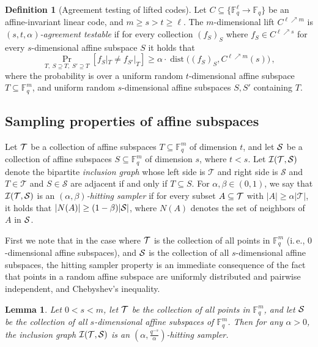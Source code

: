 \documentclass[11pt]{article}
\numberwithin{equation}{section}
\newtheorem{lemma}[theorem]{Lemma}
\theoremstyle{definition}
\newtheorem{definition}[theorem]{Definition}
\theoremstyle{plain}
\newcommand{\ie}{i.\,e.}
\theoremstyle{plain}
\DeclareMathOperator{\dist}{dist} %
\newcommand{\F}{{\mathbb{F}}}
\newcommand{\calT}{{\mathcal{T}}}
\newcommand{\calS}{{\mathcal{S}}}
\newcommand{\calI}{{\mathcal{I}}}
\newcommand{\Func}[1]{\{\F_q^{#1} \to \F_q\}}
\begin{document}
\begin{definition}[Agreement testing of lifted codes]
Let $C \subseteq \Func{\ell}$ be an affine-invariant linear  code, and $m \geq s > t \geq \ell$. The $m$-dimensional lift $C^{\ell \nearrow m}$ is \emph{$(s,t,\alpha)$-agreement testable} if for every collection $(f_S)_S$ where $f_S \in C^{\ell \nearrow s}$ for every $s$-dimensional affine subspace $S$  it holds that
\[\Pr_{T,\; S \supseteq T, \;S' \supseteq T}[f_S|_T \neq f_{S'}|_T] \geq \alpha \cdot \dist\big((f_S)_S, C^{\ell \nearrow m}(s)\big)\,,\]
where the probability is over a uniform random $t$-dimensional affine subspace $T \subseteq \F_q^m$, and uniform random $s$-dimensional affine subspaces $S,S'$ containing $T$.
\end{definition}

\subsection{Sampling properties of affine subspaces}

%

Let $\cal T$ be a collection of affine subspaces $T \subseteq \F_q^m$ of dimension $t$, and let $\cal S$ be a collection of affine subspaces
$S \subseteq \F_q^m$ of dimension $s$, %
where %
$t<s$. Let $\calI (\cal T, \cal S)$ denote the bipartite \emph{inclusion graph}
whose left side %
is $\calT$ and  %
%
right side is $\calS$  %
and
%
%
$T\in\calT$ and $S\in\calS$ are adjacent   %
if and only if $T \subseteq S$. 
For $\alpha, \beta \in (0,1)$, we say that $\calI (\cal T, \cal S)$ is 
 an \emph{$(\alpha, \beta)$-hitting sampler} if for every subset $A \subseteq \cal T$ with $|A| \geq \alpha |\calT|$, it holds that
 $|N(A)| \geq (1-\beta)  |\cal S|$, where $N(A)$ denotes the set of neighbors of $A$ in $\cal S$. 
 
 First we note that in the case where $\cal T$ is the collection of all points in $\F_q^m$ (\ie, $0$-dimensional affine subspaces), and $\cal S$ is the collection of all $s$-dimensional affine subspaces, the hitting sampler property is an immediate consequence of the fact that points in a random affine subspace are uniformly distributed and pairwise independent, and Chebyshev's inequality.

 
\begin{lemma}\label{lem:sampling-1-s}%
Let $0<s<m$, let $\cal T$ be the collection of all points in $\F_q^m$, and let $\cal S$ be the collection of all $s$-dimensional affine subspaces of $\F_q^m$. Then for any $\alpha >0$, 
 the inclusion graph $\calI(\cal T, \cal S)$ is an $(\alpha, \frac{q^{-s}} {\alpha})$-hitting sampler.
 \end{lemma}
 
\end{document}
